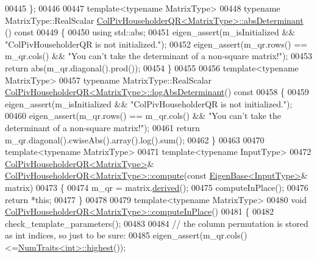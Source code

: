 \begin{DoxyCode}
00445 \};
00446 
00447 \textcolor{keyword}{template}<\textcolor{keyword}{typename} MatrixType>
00448 \textcolor{keyword}{typename} MatrixType::RealScalar \hyperlink{group___q_r___module_ac87c3bf42098d6f7324dafbc50fa83f7}{ColPivHouseholderQR<MatrixType>::absDeterminant}
      ()\textcolor{keyword}{ const}
00449 \textcolor{keyword}{}\{
00450   \textcolor{keyword}{using} std::abs;
00451   eigen\_assert(m\_isInitialized && \textcolor{stringliteral}{"ColPivHouseholderQR is not initialized."});
00452   eigen\_assert(m\_qr.rows() == m\_qr.cols() && \textcolor{stringliteral}{"You can't take the determinant of a non-square matrix!"});
00453   \textcolor{keywordflow}{return} abs(m\_qr.diagonal().prod());
00454 \}
00455 
00456 \textcolor{keyword}{template}<\textcolor{keyword}{typename} MatrixType>
00457 \textcolor{keyword}{typename} MatrixType::RealScalar 
      \hyperlink{group___q_r___module_afdc29438a335871f67449c253369ce12}{ColPivHouseholderQR<MatrixType>::logAbsDeterminant}()\textcolor{keyword}{
       const}
00458 \textcolor{keyword}{}\{
00459   eigen\_assert(m\_isInitialized && \textcolor{stringliteral}{"ColPivHouseholderQR is not initialized."});
00460   eigen\_assert(m\_qr.rows() == m\_qr.cols() && \textcolor{stringliteral}{"You can't take the determinant of a non-square matrix!"});
00461   \textcolor{keywordflow}{return} m\_qr.diagonal().cwiseAbs().array().log().sum();
00462 \}
00463 
00470 \textcolor{keyword}{template}<\textcolor{keyword}{typename} MatrixType>
00471 \textcolor{keyword}{template}<\textcolor{keyword}{typename} InputType>
00472 \hyperlink{group___q_r___module}{ColPivHouseholderQR<MatrixType>}& 
      \hyperlink{group___q_r___module_class_eigen_1_1_col_piv_householder_q_r}{ColPivHouseholderQR<MatrixType>::compute}(\textcolor{keyword}{const} 
      \hyperlink{group___core___module_struct_eigen_1_1_eigen_base}{EigenBase<InputType>}& matrix)
00473 \{
00474   m\_qr = matrix.\hyperlink{group___core___module_a324b16961a11d2ecfd2d1b7dd7946545}{derived}();
00475   computeInPlace();
00476   \textcolor{keywordflow}{return} *\textcolor{keyword}{this};
00477 \}
00478 
00479 \textcolor{keyword}{template}<\textcolor{keyword}{typename} MatrixType>
00480 \textcolor{keywordtype}{void} \hyperlink{group___q_r___module_class_eigen_1_1_col_piv_householder_q_r}{ColPivHouseholderQR<MatrixType>::computeInPlace}()
00481 \{
00482   check\_template\_parameters();
00483 
00484   \textcolor{comment}{// the column permutation is stored as int indices, so just to be sure:}
00485   eigen\_assert(m\_qr.cols()<=\hyperlink{group___core___module_struct_eigen_1_1_num_traits}{NumTraits<int>::highest}());

\end{DoxyCode}
